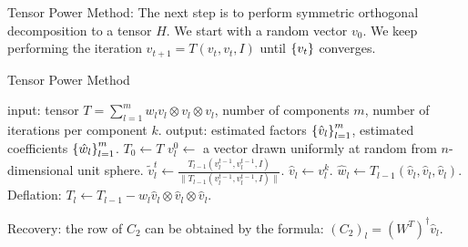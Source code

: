 Tensor Power Method: The next step is to perform symmetric orthogonal decomposition to a tensor $H$.
We start with a random vector $v_0$. We keep performing the iteration $v_{t+1} = T(v_t, v_t, I)$ until $\cbr{v_t}$ converges.
\begin{algorithm}
\caption{Tensor Power Method}
\begin{algorithmic}
\STATE input: tensor $T = \sum_{l=1}^m w_l v_l \otimes v_l \otimes v_l$, number of components $m$, number of iterations per component $k$.
\STATE output: estimated factors $\cbr{\hat{v}_l}_{l=1}^m$, estimated coefficients $\cbr{\hat{w}_l}_{l=1}^m$.
\STATE $T_0 \gets T$
    \STATE $v_l^0 \gets$ a vector drawn uniformly at random from $n$-dimensional unit sphere.
        \STATE $\tilde{v}_l^t \gets \frac{T_{l-1}(v_l^{t-1}, v_l^{t-1}, I)}{\|T_{l-1}(v_l^{t-1}, v_l^{t-1}, I)\|}$.
    \ENDFOR
    \STATE $\hat{v}_l \gets v_l^k$.
    \STATE $\hat{w}_l \gets T_{l-1}(\hat{v}_l, \hat{v}_l, \hat{v}_l)$.
    \STATE Deflation: $T_l \gets T_{l-1} - \hat{w}_l \hat{v}_l \otimes \hat{v}_l \otimes \hat{v}_l$.
\ENDFOR
\end{algorithmic}
\end{algorithm}

Recovery: the row of $C_2$ can be obtained by the formula: $(C_2)_l = (W^T)^{\dagger} \hat{v}_l$.
